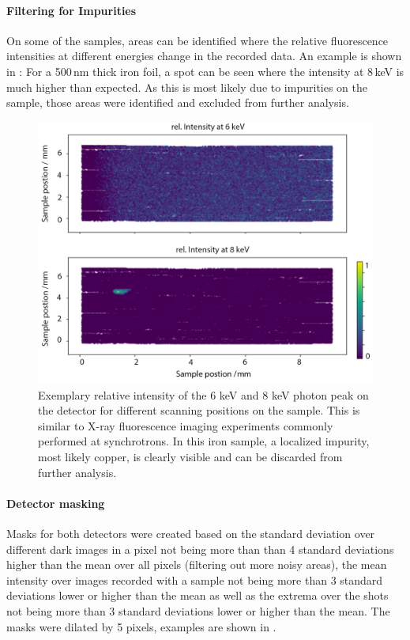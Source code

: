 \paragraph{Filtering for Impurities}
On some of the samples, areas can be identified where the relative fluorescence intensities at different energies change in the recorded data. An example is shown in : For a 500\,nm thick iron foil, a spot can be seen where the intensity at 8\,keV is much higher than expected. As this is most likely due to impurities on the sample, those areas were identified and excluded from further analysis.

\begin{figure}
	\centering
	\includegraphics[width=0.8\linewidth]{images/xrf.png}
	\caption[Relative intensity of the 6 keV and 8 keV photon peak on the detector for different scanning positions on one sample]{Exemplary relative intensity of the 6 keV and 8 keV photon peak on the detector for different scanning positions on the sample. This is similar to X-ray fluorescence imaging experiments commonly performed at synchrotrons. In this iron sample, a localized impurity, most likely copper, is clearly visible and can be discarded from further analysis.}
	\label{fig:xrf}
\end{figure}

\paragraph{Detector masking}
Masks for both detectors were created based on the standard deviation over different dark images in a pixel not being more than than 4 standard deviations higher than the mean over all pixels (filtering out more noisy areas), the mean intensity over images recorded with a sample not being more than 3 standard deviations lower or higher than the mean as well as the extrema over the shots not being more than 3 standard deviations lower or higher than the mean. The masks were dilated by 5 pixels, examples are shown in .

